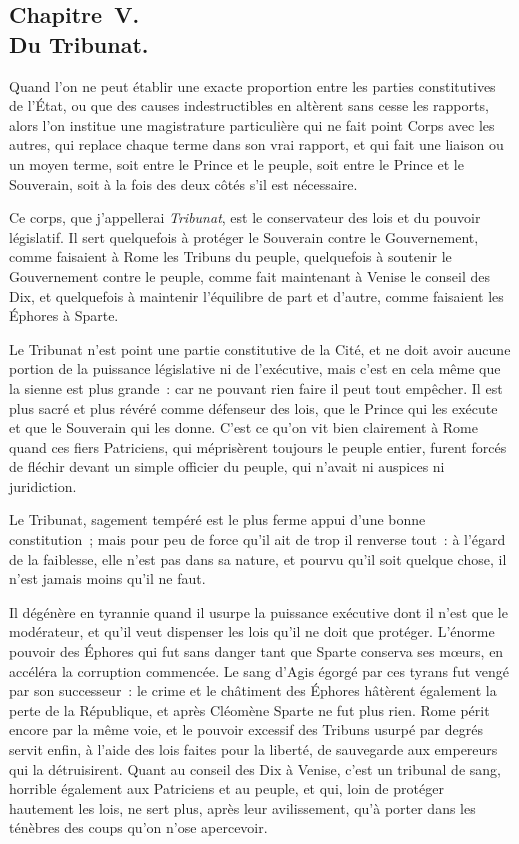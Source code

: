 \documentclass[french,twoside]{book} %
\begin{document}
\subsection[{Chapitre V. Du Tribunat.}]{Chapitre V. \\
Du Tribunat.}
\noindent Quand l’on ne peut établir une exacte proportion entre les parties constitutives de l’État, ou que des causes indestructibles en altèrent sans cesse les rapports, alors l’on institue une magistrature particulière qui ne fait point Corps avec les autres, qui replace chaque terme dans son vrai rapport, et qui fait une liaison ou un moyen terme, soit entre le Prince et le peuple, soit entre le Prince et le Souverain, soit à la fois des deux côtés s’il est nécessaire.\par
Ce corps, que j’appellerai {\itshape Tribunat}, est le conservateur des lois et du pouvoir législatif. Il sert quelquefois à protéger le Souverain contre le Gouvernement, comme faisaient à Rome les Tribuns du peuple, quelquefois à soutenir le Gouvernement contre le peuple, comme fait maintenant à Venise le conseil des Dix, et quelquefois à maintenir l’équilibre de part et d’autre, comme faisaient les Éphores à Sparte.\par
Le Tribunat n’est point une partie constitutive de la Cité, et ne doit avoir aucune portion de la puissance législative ni de l’exécutive, mais c’est en cela même que la sienne est plus grande : car ne pouvant rien faire il peut tout empêcher. Il est plus sacré et plus révéré comme défenseur des lois, que le Prince qui les exécute et que le Souverain qui les donne. C’est ce qu’on vit bien clairement à Rome quand ces fiers Patriciens, qui méprisèrent toujours le peuple entier, furent forcés de fléchir devant un simple officier du peuple, qui n’avait ni auspices ni juridiction.\par
Le Tribunat, sagement tempéré est le plus ferme appui d’une bonne constitution ; mais pour peu de force qu’il ait de trop il renverse tout : à l’égard de la faiblesse, elle n’est pas dans sa nature, et pourvu qu’il soit quelque chose, il n’est jamais moins qu’il ne faut.\par
Il dégénère en tyrannie quand il usurpe la puissance exécutive dont il n’est que le modérateur, et qu’il veut dispenser les lois qu’il ne doit que protéger. L’énorme pouvoir des Éphores qui fut sans danger tant que Sparte conserva ses mœurs, en accéléra la corruption commencée. Le sang d’Agis égorgé par ces tyrans fut vengé par son successeur : le crime et le châtiment des Éphores hâtèrent également la perte de la République, et après Cléomène Sparte ne fut plus rien. Rome périt encore par la même voie, et le pouvoir excessif des Tribuns usurpé par degrés servit enfin, à l’aide des lois faites pour la liberté, de sauvegarde aux empereurs qui la détruisirent. Quant au conseil des Dix à Venise, c’est un tribunal de sang, horrible également aux Patriciens et au peuple, et qui, loin de protéger hautement les lois, ne sert plus, après leur avilissement, qu’à porter dans les ténèbres des coups qu’on n’ose apercevoir.\par
\end{document}
